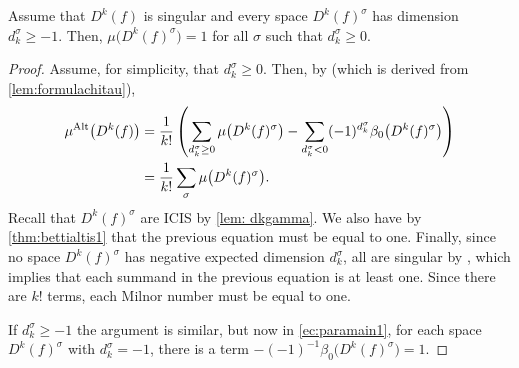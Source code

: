\documentclass[a4paper,12pt]{amsart}
\begin{document}
%
%

\begin{lemma}\label{lem:paramain}
Assume that $D^k(f)$ is singular and every space $D^k(f)^\sigma$ has dimension $d_k^\sigma\geq-1$. Then, $\mu\big(D^k(f)^\sigma\big)=1$ for all $\sigma$ such that $d_k^\sigma\geq0$.
\end{lemma}
\begin{proof}
Assume, for simplicity, that $d_k^\sigma\geq0$. Then, by \cite[Theorem 4.7]{GimenezConejero2022c} (which is derived from \cref{lem:formulachitau}),
\begin{align}
\mu^{\textnormal{Alt}}\big(D^k(f)\big)&=\frac{1}{k!}\left(\sum_{ d_k^\sigma\geq0}\mu\big(D^k(f)^\sigma\big)-\sum_{ d_k^\sigma<0}(-1)^{d_k^\sigma}\beta_0\big(D^k(f)^\sigma\big)\right)\\ \label{ec:paramain1}
 & =\frac{1}{k!}\sum_{ \sigma}\mu\big(D^k(f)^\sigma\big).
\end{align}
Recall that $D^k(f)^\sigma$ are ICIS by \cref{lem: dkgamma}. We also have by \cref{thm:bettialtis1} that the previous equation must be equal to one. Finally, since no space $D^k(f)^\sigma$ has negative expected dimension $d_k^\sigma$, all are singular by \cite[Theorem 4.8]{GimenezConejero2022c}, which implies that each summand in the previous equation is at least one. Since there are $k!$ terms, each Milnor number must be equal to one.

If $d_k^\sigma\geq-1$ the argument is similar, but now in \cref{ec:paramain1}, for each space $D^k(f)^\sigma$ with $d_k^\sigma=-1$, there is a term $-(-1)^{-1}\beta_0\big(D^k(f)^\sigma\big)=1$.
\end{proof}
\end{document}
